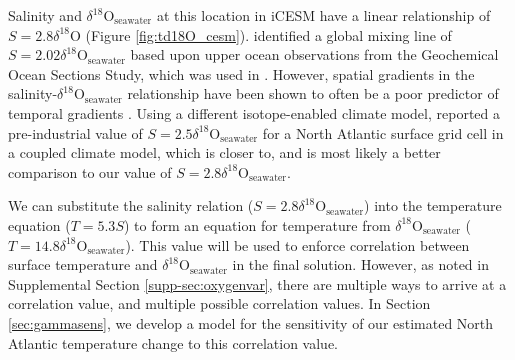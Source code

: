 \documentclass[draft]{agujournal2019}
\begin{document}
Salinity and $\delta^{18}\mathrm{O}_{\mathrm{seawater}}$ at this location in iCESM have a linear relationship of $S = 2.8 \delta^{18}\mathrm{O}$ (Figure \ref{fig:td18O_cesm}).  identified a global mixing line of $S = 2.02 \delta^{18}\mathrm{O}_{\mathrm{seawater}}$ based upon upper ocean observations from the Geochemical Ocean Sections Study, which was used in \cite{Gebbie2006}. However, spatial gradients in the salinity-$\delta^{18}\mathrm{O}_{\mathrm{seawater}}$ relationship have been shown to often be a poor predictor of temporal gradients \cite[]{Schmidt-1998:Oxygen, Schmidt-LeGrande-2007:Water}. Using a different isotope-enabled climate model,  reported a pre-industrial value of $S = 2.5 \delta^{18}\mathrm{O}_{\mathrm{seawater}}$ for a North Atlantic surface grid cell in a coupled climate model, which is closer to, and is most likely a better comparison to our value of $S = 2.8 \delta^{18}\mathrm{O}_{\mathrm{seawater}}$. 

We can substitute the salinity relation ($S = 2.8\delta^{18}\mathrm{O}_{\mathrm{seawater}}$) into the temperature equation ($T = 5.3S$) to form an equation for temperature from $\delta^{18}\mathrm{O}_{\mathrm{seawater}}$ ($T = 14.8 \delta^{18}\mathrm{O}_{\mathrm{seawater}}$). This value will be used to enforce correlation between surface temperature and $\delta^{18}\mathrm{O}_{\mathrm{seawater}}$ in the final solution. However, as noted in Supplemental Section \ref{supp-sec:oxygenvar}, there are multiple ways to arrive at a correlation value, and multiple possible correlation values. In Section \ref{sec:gammasens}, we develop a model for the sensitivity of our estimated North Atlantic temperature change to this correlation value. 
%


\end{document}
